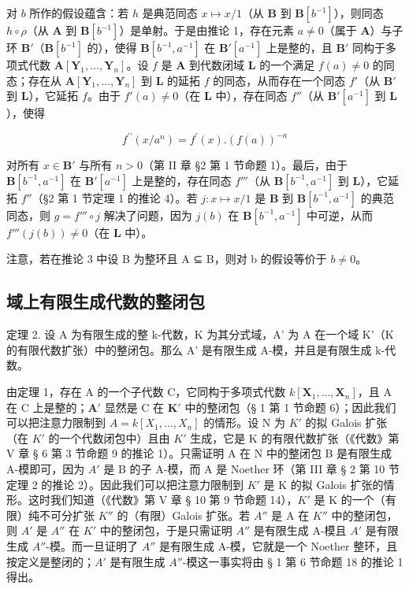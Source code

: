 对 \(b\) 所作的假设蕴含：若 \(h\) 是典范同态 \(x \mapsto x / 1\)（从 \(\mathbf{B}\) 到 \(\mathbf{B}[b^{-1}]\)），则同态 \(h \circ \rho\)（从 \(\mathbf{A}\) 到 \(\mathbf{B}[b^{-1}]\)）是单射。于是由推论 1，存在元素 \(a \neq 0\)（属于 \(\mathbf{A}\)）与子环 \(\mathbf{B}'\)（\(\mathbf{B}[b^{-1}]\) 的），使得 \(\mathbf{B}[b^{-1}, a^{-1}]\) 在 \(\mathbf{B}'[a^{-1}]\) 上是整的，且 \(\mathbf{B}'\) 同构于多项式代数 \(\mathbf{A}[\mathbf{Y}_1, \ldots, \mathbf{Y}_n]\)。设 \(f\) 是 \(\mathbf{A}\) 到代数闭域 \(\mathbf{L}\) 的一个满足 \(f(a) \neq 0\) 的同态；存在从 \(\mathbf{A}[\mathbf{Y}_1, \ldots, \mathbf{Y}_n]\) 到 \(\mathbf{L}\) 的延拓 \(f\) 的同态，从而存在一个同态 \(f'\)（从 \(\mathbf{B}'\) 到 \(\mathbf{L}\)），它延拓 \(f\)。由于 \(f'(a) \neq 0\)（在 \(\mathbf{L}\) 中），存在同态 \(f''\)（从 \(\mathbf{B}'[a^{-1}]\) 到 \(\mathbf{L}\)），使得

\[
f ^ {\prime \prime} (x / a ^ {n}) = f ^ {\prime} (x). (f (a)) ^ {- n}
\]

对所有 \(x \in \mathbf{B}'\) 与所有 \(n > 0\)（第 II 章 §2 第 1 节命题 1）。最后，由于 \(\mathbf{B}[b^{-1}, a^{-1}]\) 在 \(\mathbf{B}'[a^{-1}]\) 上是整的，存在同态 \(f'''\)（从 \(\mathbf{B}[b^{-1}, a^{-1}]\) 到 \(\mathbf{L}\)），它延拓 \(f''\)（§2 第 1 节定理 1 的推论 4）。若 \(j: x \mapsto x / 1\) 是 \(\mathbf{B}\) 到 \(\mathbf{B}[b^{-1}, a^{-1}]\) 的典范同态，则 \(g = f''' \circ j\) 解决了问题，因为 \(j(b)\) 在 \(\mathbf{B}[b^{-1}, a^{-1}]\) 中可逆，从而 \(f'''(j(b)) \neq 0\)（在 \(\mathbf{L}\) 中）。

注意，若在推论 3 中设 B 为整环且 A ⊆ B，则对 b 的假设等价于 \(b \neq 0\)。

\subsection{域上有限生成代数的整闭包}

定理 2. 设 A 为有限生成的整 k-代数，K 为其分式域，A' 为 A 在一个域 K'（K 的有限代数扩张）中的整闭包。那么 A' 是有限生成 A-模，并且是有限生成 k-代数。

由定理 1，存在 A 的一个子代数 C，它同构于多项式代数 \(k[\mathbf{X}_1, \ldots, \mathbf{X}_n]\)，且 A 在 C 上是整的；\(\mathbf{A}'\) 显然是 C 在 \(\mathbf{K}'\) 中的整闭包（§ 1 第 1 节命题 6）；因此我们可以把注意力限制到 \(A = k[X_{1}, \ldots, X_{n}]\) 的情形。设 N 为 \(K'\) 的拟 Galois 扩张（在 \(K'\) 的一个代数闭包中）且由 \(K'\) 生成，它是 K 的有限代数扩张（《代数》第 V 章 § 6 第 3 节命题 9 的推论 1）。只需证明 A 在 N 中的整闭包 B 是有限生成 A-模即可，因为 \(A'\) 是 B 的子 A-模，而 A 是 Noether 环（第 III 章 § 2 第 10 节定理 2 的推论 2）。因此我们可以把注意力限制到 \(K'\) 是 K 的拟 Galois 扩张的情形。这时我们知道（《代数》第 V 章 § 10 第 9 节命题 14），\(K'\) 是 K 的一个（有限）纯不可分扩张 \(K''\) 的（有限）Galois 扩张。若 \(A''\) 是 A 在 \(K''\) 中的整闭包，则 \(A'\) 是 \(A''\) 在 \(K'\) 中的整闭包，于是只需证明 \(A''\) 是有限生成 A-模且 \(A'\) 是有限生成 \(A''\)-模。而一旦证明了 \(A''\) 是有限生成 A-模，它就是一个 Noether 整环，且按定义是整闭的；\(A'\) 是有限生成 \(A''\)-模这一事实将由 § 1 第 6 节命题 18 的推论 1 得出。

